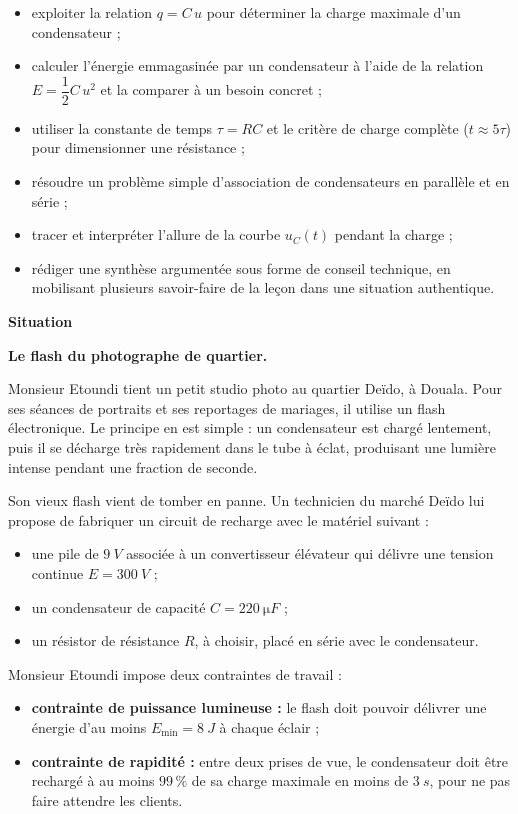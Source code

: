\documentclass[11pt]{article}
\newcommand{\cle}[1]{{\popxbold\color{popdark}#1}}
\begin{document}
\begin{itemize}
\item exploiter la relation $q = C\,u$ pour déterminer la charge maximale d'un condensateur ;
\item calculer l'énergie emmagasinée par un condensateur à l'aide de la relation $E = \dfrac{1}{2}C\,u^2$ et la comparer à un besoin concret ;
\item utiliser la constante de temps $\tau = RC$ et le critère de charge complète ($t \approx 5\tau$) pour dimensionner une résistance ;
\item résoudre un problème simple d'association de condensateurs en parallèle et en série ;
\item tracer et interpréter l'allure de la courbe $u_C(t)$ pendant la charge ;
\item rédiger une synthèse argumentée sous forme de conseil technique, en mobilisant plusieurs savoir-faire de la leçon dans une situation authentique.
\end{itemize}

\textbf{Situation}\par

\textbf{Le flash du photographe de quartier.}

Monsieur Etoundi tient un petit studio photo au quartier Deïdo, à Douala. Pour ses séances de portraits et ses reportages de mariages, il utilise un flash électronique. Le principe en est simple : un \cle{condensateur} est chargé lentement, puis il se décharge très rapidement dans le tube à éclat, produisant une lumière intense pendant une fraction de seconde.

Son vieux flash vient de tomber en panne. Un technicien du marché Deïdo lui propose de fabriquer un circuit de recharge avec le matériel suivant :

\begin{itemize}
\item une pile de $\SI{9}{V}$ associée à un convertisseur élévateur qui délivre une tension continue $E = \SI{300}{V}$ ;
\item un condensateur de capacité $C = \SI{220}{\micro F}$ ;
\item un résistor de résistance $R$, à choisir, placé en série avec le condensateur.
\end{itemize}

Monsieur Etoundi impose deux contraintes de travail :

\begin{itemize}
\item \textbf{contrainte de puissance lumineuse :} le flash doit pouvoir délivrer une énergie d'au moins $E_{\min} = \SI{8}{J}$ à chaque éclair ;
\item \textbf{contrainte de rapidité :} entre deux prises de vue, le condensateur doit être rechargé à au moins $99\,\%$ de sa charge maximale en moins de $\SI{3}{s}$, pour ne pas faire attendre les clients.
\end{itemize}
\end{document}

